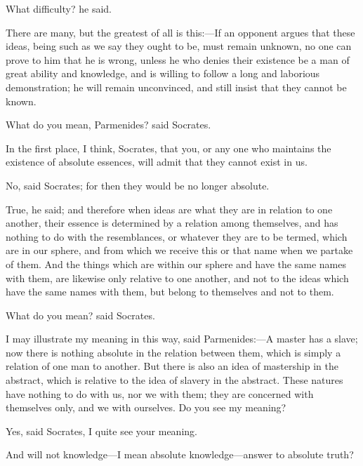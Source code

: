 \documentclass[11pt,letter]{article}
\begin{document}
\par  What difficulty? he said.

\par  There are many, but the greatest of all is this:—If an opponent argues that these ideas, being such as we say they ought to be, must remain unknown, no one can prove to him that he is wrong, unless he who denies their existence be a man of great ability and knowledge, and is willing to follow a long and laborious demonstration; he will remain unconvinced, and still insist that they cannot be known.

\par  What do you mean, Parmenides? said Socrates.

\par  In the first place, I think, Socrates, that you, or any one who maintains the existence of absolute essences, will admit that they cannot exist in us.

\par  No, said Socrates; for then they would be no longer absolute.

\par  True, he said; and therefore when ideas are what they are in relation to one another, their essence is determined by a relation among themselves, and has nothing to do with the resemblances, or whatever they are to be termed, which are in our sphere, and from which we receive this or that name when we partake of them. And the things which are within our sphere and have the same names with them, are likewise only relative to one another, and not to the ideas which have the same names with them, but belong to themselves and not to them.

\par  What do you mean? said Socrates.

\par  I may illustrate my meaning in this way, said Parmenides:—A master has a slave; now there is nothing absolute in the relation between them, which is simply a relation of one man to another. But there is also an idea of mastership in the abstract, which is relative to the idea of slavery in the abstract. These natures have nothing to do with us, nor we with them; they are concerned with themselves only, and we with ourselves. Do you see my meaning?

\par  Yes, said Socrates, I quite see your meaning.

\par  And will not knowledge—I mean absolute knowledge—answer to absolute truth?
\end{document}
